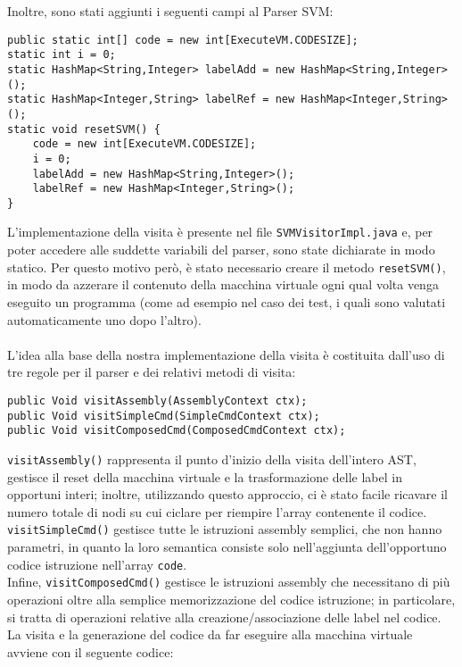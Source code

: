\documentclass[a4paper]{article}   %
\begin{document}
Inoltre, sono stati aggiunti i seguenti campi al Parser SVM:
\begin{lstlisting}[basicstyle=\footnotesize\ttfamily]
public static int[] code = new int[ExecuteVM.CODESIZE];
static int i = 0;
static HashMap<String,Integer> labelAdd = new HashMap<String,Integer>();
static HashMap<Integer,String> labelRef = new HashMap<Integer,String>();
static void resetSVM() {
    code = new int[ExecuteVM.CODESIZE];
    i = 0;
    labelAdd = new HashMap<String,Integer>();
    labelRef = new HashMap<Integer,String>();
}
\end{lstlisting}
L'implementazione della visita è presente nel file \lstinline|SVMVisitorImpl.java| e, per poter accedere alle suddette variabili del parser, sono state dichiarate in modo statico. Per questo motivo però, è stato necessario creare il metodo \lstinline|resetSVM()|, in modo da azzerare il contenuto della macchina virtuale ogni qual volta venga eseguito un programma (come ad esempio nel caso dei test, i quali sono valutati automaticamente uno dopo l'altro).\\\\
L'idea alla base della nostra implementazione della visita è costituita dall'uso di tre regole per il parser e dei relativi metodi di visita:
\begin{lstlisting}[basicstyle=\footnotesize\ttfamily]
public Void visitAssembly(AssemblyContext ctx);
public Void visitSimpleCmd(SimpleCmdContext ctx);
public Void visitComposedCmd(ComposedCmdContext ctx);
\end{lstlisting}
\lstinline|visitAssembly()| rappresenta il punto d'inizio della visita dell'intero AST, gestisce il reset della macchina virtuale e la trasformazione delle label in opportuni interi; inoltre, utilizzando questo approccio, ci è stato facile ricavare il numero totale di nodi su cui ciclare per riempire l'array contenente il codice.\\
\lstinline|visitSimpleCmd()| gestisce tutte le istruzioni assembly semplici, che non hanno parametri, in quanto la loro semantica consiste solo nell'aggiunta dell'opportuno codice istruzione nell'array \lstinline|code|.\\
Infine, \lstinline|visitComposedCmd()| gestisce le istruzioni assembly che necessitano di più operazioni oltre alla semplice memorizzazione del codice istruzione; in particolare, si tratta di operazioni relative alla creazione/associazione delle label nel codice.\\
La visita e la generazione del codice da far eseguire alla macchina virtuale avviene con il seguente codice:
\end{document}
